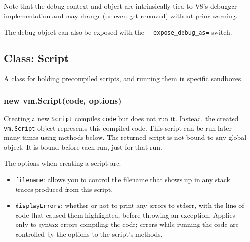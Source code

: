 \begin{Shaded}
\begin{Highlighting}[]
 \NormalTok{(}\NormalTok{);}
\NormalTok{(}\NormalTok{(}\NormalTok{); \});}
\end{Highlighting}
\end{Shaded}

Note that the debug context and object are intrinsically tied to V8's
debugger implementation and may change (or even get removed) without
prior warning.

The debug object can also be exposed with the
\texttt{-{}-expose\_debug\_as=} switch.

\subsection{Class: Script}\label{class-script}

A class for holding precompiled scripts, and running them in specific
sandboxes.

\subsubsection{new vm.Script(code,
options)}\label{new-vm.scriptcode-options}

Creating a new \texttt{Script} compiles \texttt{code} but does not run
it. Instead, the created \texttt{vm.Script} object represents this
compiled code. This script can be run later many times using methods
below. The returned script is not bound to any global object. It is
bound before each run, just for that run.

The options when creating a script are:

\begin{itemize}
\itemsep1pt\parskip0pt
\item
  \texttt{filename}: allows you to control the filename that shows up in
  any stack traces produced from this script.
\item
  \texttt{displayErrors}: whether or not to print any errors to stderr,
  with the line of code that caused them highlighted, before throwing an
  exception. Applies only to syntax errors compiling the code; errors
  while running the code are controlled by the options to the script's
  methods.
\end{itemize}

